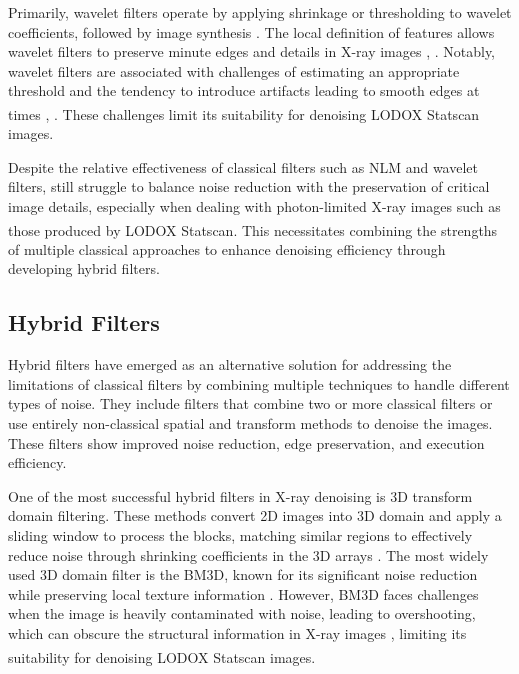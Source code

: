 Primarily, wavelet filters operate by applying shrinkage or thresholding to wavelet coefficients, followed by image synthesis \cite{rodrigues_denoising_2008}.  The local definition of features allows wavelet filters to preserve minute edges and details in X-ray images \cite{juneja_denoising_2024}, \cite{rodrigues_denoising_2008}.  Notably, wavelet filters are associated with challenges of estimating an appropriate threshold and the tendency to introduce artifacts leading to smooth edges at times \cite{juneja_denoising_2024}, \cite{rodrigues_denoising_2008}. These challenges limit its suitability for denoising LODOX\textsuperscript{\textregistered} Statscan\textsuperscript{\textregistered} images.

Despite the relative effectiveness of classical filters such as \gls{NLM} and wavelet filters, still struggle to balance noise reduction with the preservation of critical image details, especially when dealing with photon-limited X-ray images such as those produced by LODOX\textsuperscript{\textregistered} Statscan\textsuperscript{\textregistered}. This necessitates combining the strengths of multiple classical approaches to enhance denoising efficiency through developing hybrid filters.
\subsection{Hybrid Filters}
Hybrid filters have emerged as an alternative solution for addressing the limitations of classical filters by combining multiple techniques to handle different types of noise.  They include filters that combine two or more classical filters or use entirely non-classical spatial and transform methods to denoise the images. These filters show improved noise reduction, edge preservation, and execution efficiency. 

One of the most successful hybrid filters in X-ray denoising is 3D transform domain filtering.  These methods convert 2D images into 3D domain and apply a sliding window to process the blocks, matching similar regions to effectively reduce noise through shrinking coefficients in the 3D arrays \cite{rodrigues_denoising_2008}. The most widely used 3D domain filter is the \gls{BM3D}, known for its significant noise reduction while preserving local texture information \cite{chandra_analysis_2020}. However, \gls{BM3D} faces challenges when the image is heavily contaminated with noise, leading to overshooting, which can obscure the structural information in X-ray images \cite{chandra_analysis_2020}, limiting its suitability for denoising LODOX\textsuperscript{\textregistered} Statscan\textsuperscript{\textregistered} images.

